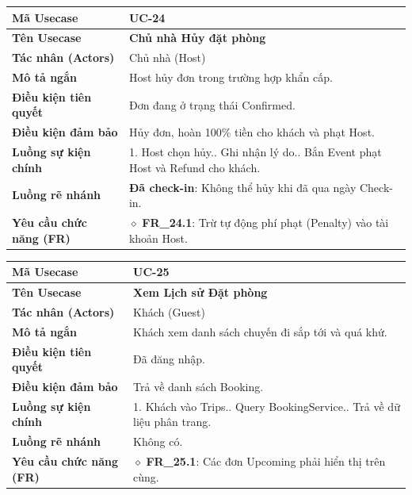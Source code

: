 \begin{table}[H]
\renewcommand{\arraystretch}{1.3}
\centering
\begin{tabularx}{\textwidth}{|p{4.5cm}|X|}
\hline
\cellcolor{gray!15}\bfseries Mã Usecase & \textbf{UC-24} \\ \hline
\cellcolor{gray!15}\bfseries Tên Usecase & \textbf{Chủ nhà Hủy đặt phòng} \\ \hline
\cellcolor{gray!15}\bfseries Tác nhân (Actors) & Chủ nhà (Host) \\ \hline
\cellcolor{gray!15}\bfseries Mô tả ngắn & Host hủy đơn trong trường hợp khẩn cấp. \\ \hline
\cellcolor{gray!15}\bfseries Điều kiện tiên quyết & Đơn đang ở trạng thái Confirmed. \\ \hline
\cellcolor{gray!15}\bfseries Điều kiện đảm bảo & Hủy đơn, hoàn 100\% tiền cho khách và phạt Host. \\ \hline
\cellcolor{gray!15}\bfseries Luồng sự kiện chính & 1. Host chọn hủy.\newline 2. Ghi nhận lý do.\newline 3. Bắn Event phạt Host và Refund cho khách. \\ \hline
\cellcolor{gray!15}\bfseries Luồng rẽ nhánh & \textbf{Đã check-in}: Không thể hủy khi đã qua ngày Check-in. \\ \hline
\cellcolor{gray!15}\bfseries Yêu cầu chức năng (FR) & $\diamond$ \textbf{FR\_24.1}: Trừ tự động phí phạt (Penalty) vào tài khoản Host. \\ \hline
\end{tabularx}
\end{table}

\begin{table}[H]
\renewcommand{\arraystretch}{1.3}
\centering
\begin{tabularx}{\textwidth}{|p{4.5cm}|X|}
\hline
\cellcolor{gray!15}\bfseries Mã Usecase & \textbf{UC-25} \\ \hline
\cellcolor{gray!15}\bfseries Tên Usecase & \textbf{Xem Lịch sử Đặt phòng} \\ \hline
\cellcolor{gray!15}\bfseries Tác nhân (Actors) & Khách (Guest) \\ \hline
\cellcolor{gray!15}\bfseries Mô tả ngắn & Khách xem danh sách chuyến đi sắp tới và quá khứ. \\ \hline
\cellcolor{gray!15}\bfseries Điều kiện tiên quyết & Đã đăng nhập. \\ \hline
\cellcolor{gray!15}\bfseries Điều kiện đảm bảo & Trả về danh sách Booking. \\ \hline
\cellcolor{gray!15}\bfseries Luồng sự kiện chính & 1. Khách vào Trips.\newline 2. Query BookingService.\newline 3. Trả về dữ liệu phân trang. \\ \hline
\cellcolor{gray!15}\bfseries Luồng rẽ nhánh & Không có. \\ \hline
\cellcolor{gray!15}\bfseries Yêu cầu chức năng (FR) & $\diamond$ \textbf{FR\_25.1}: Các đơn Upcoming phải hiển thị trên cùng. \\ \hline
\end{tabularx}
\end{table}

